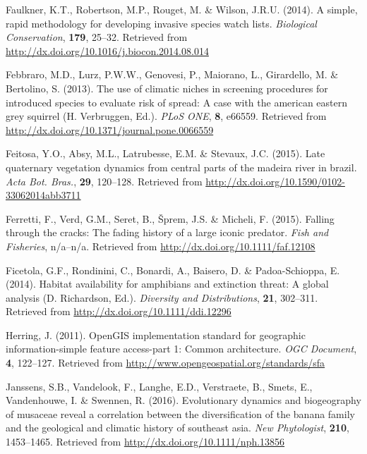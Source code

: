 \documentclass[3p]{elsarticle} %
\newlength{\cslhangindent}
\newenvironment{cslreferences}%
  {\setlength{\parindent}{0pt}%
  \everypar{\setlength{\hangindent}{\cslhangindent}}\ignorespaces}%
  {\par}
\begin{document}
\begin{cslreferences}
\leavevmode\hypertarget{ref-Faulkner_2014}{}%
Faulkner, K.T., Robertson, M.P., Rouget, M. \& Wilson, J.R.U. (2014). A
simple, rapid methodology for developing invasive species watch lists.
\emph{Biological Conservation}, \textbf{179}, 25--32. Retrieved from
\url{http://dx.doi.org/10.1016/j.biocon.2014.08.014}

\leavevmode\hypertarget{ref-Di_Febbraro_2013}{}%
Febbraro, M.D., Lurz, P.W.W., Genovesi, P., Maiorano, L., Girardello, M.
\& Bertolino, S. (2013). The use of climatic niches in screening
procedures for introduced species to evaluate risk of spread: A case
with the american eastern grey squirrel (H. Verbruggen, Ed.). \emph{PLoS
ONE}, \textbf{8}, e66559. Retrieved from
\url{http://dx.doi.org/10.1371/journal.pone.0066559}

\leavevmode\hypertarget{ref-Feitosa_2015}{}%
Feitosa, Y.O., Absy, M.L., Latrubesse, E.M. \& Stevaux, J.C. (2015).
Late quaternary vegetation dynamics from central parts of the madeira
river in brazil. \emph{Acta Bot. Bras.}, \textbf{29}, 120--128.
Retrieved from \url{http://dx.doi.org/10.1590/0102-33062014abb3711}

\leavevmode\hypertarget{ref-Ferretti_2015}{}%
Ferretti, F., Verd, G.M., Seret, B., Šprem, J.S. \& Micheli, F. (2015).
Falling through the cracks: The fading history of a large iconic
predator. \emph{Fish and Fisheries}, n/a--n/a. Retrieved from
\url{http://dx.doi.org/10.1111/faf.12108}

\leavevmode\hypertarget{ref-Ficetola_2014}{}%
Ficetola, G.F., Rondinini, C., Bonardi, A., Baisero, D. \&
Padoa-Schioppa, E. (2014). Habitat availability for amphibians and
extinction threat: A global analysis (D. Richardson, Ed.).
\emph{Diversity and Distributions}, \textbf{21}, 302--311. Retrieved
from \url{http://dx.doi.org/10.1111/ddi.12296}

\leavevmode\hypertarget{ref-wkt}{}%
Herring, J. (2011). OpenGIS implementation standard for geographic
information-simple feature access-part 1: Common architecture. \emph{OGC
Document}, \textbf{4}, 122--127. Retrieved from
\url{http://www.opengeospatial.org/standards/sfa}

\leavevmode\hypertarget{ref-Janssens_2016}{}%
Janssens, S.B., Vandelook, F., Langhe, E.D., Verstraete, B., Smets, E.,
Vandenhouwe, I. \& Swennen, R. (2016). Evolutionary dynamics and
biogeography of musaceae reveal a correlation between the
diversification of the banana family and the geological and climatic
history of southeast asia. \emph{New Phytologist}, \textbf{210},
1453--1465. Retrieved from \url{http://dx.doi.org/10.1111/nph.13856}


\end{cslreferences}
\end{document}
